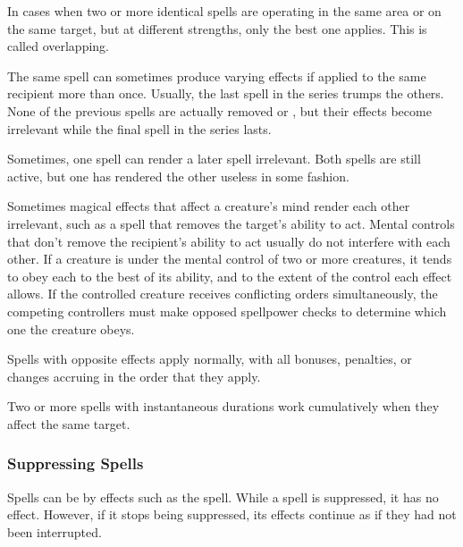              In cases when two or more identical spells are operating in the same area or on the same target, but at different strengths, only the best one applies.
            This is called overlapping.

             The same spell can sometimes produce varying effects if applied to the same recipient more than once.
            Usually, the last spell in the series trumps the others.
            None of the previous spells are actually removed or , but their effects become irrelevant while the final spell in the series lasts.

             Sometimes, one spell can render a later spell irrelevant.
            Both spells are still active, but one has rendered the other useless in some fashion.

             Sometimes magical effects that affect a creature's mind render each other irrelevant, such as a spell that removes the target's ability to act.
            Mental controls that don't remove the recipient's ability to act usually do not interfere with each other.
            If a creature is under the mental control of two or more creatures, it tends to obey each to the best of its ability, and to the extent of the control each effect allows.
            If the controlled creature receives conflicting orders simultaneously, the competing controllers must make opposed spellpower checks to determine which one the creature obeys.

             Spells with opposite effects apply normally, with all bonuses, penalties, or changes accruing in the order that they apply.

             Two or more spells with instantaneous durations work cumulatively when they affect the same target.

        \subsubsection{Suppressing Spells}\label{Suppressing Spells}
            Spells can be  by effects such as the  spell.
            While a spell is suppressed, it has no effect.
            However, if it stops being suppressed, its effects continue as if they had not been interrupted.

